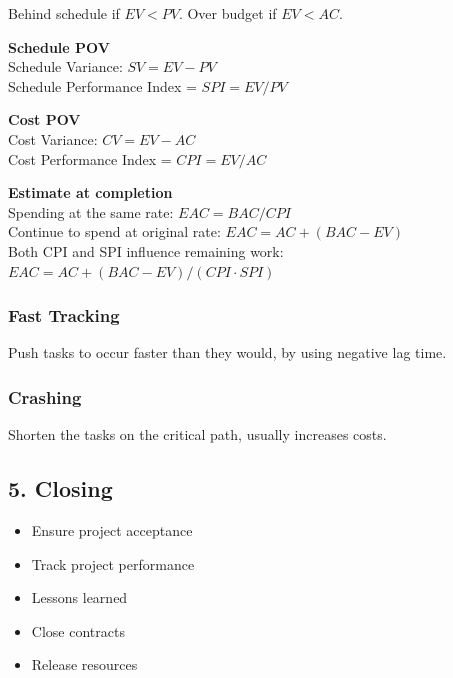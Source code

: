 Behind schedule if $EV < PV$.
Over budget if $EV < AC$.

\textbf{Schedule POV}\\
Schedule Variance: $SV = EV - PV$\\
Schedule Performance Index = $SPI = EV/PV$

\textbf{Cost POV}\\
Cost Variance: $CV = EV - AC$\\
Cost Performance Index = $CPI = EV/AC$

\textbf{Estimate at completion}\\
Spending at the same rate: $EAC = BAC/CPI$\\
Continue to spend at original rate: $EAC = AC + (BAC - EV)$\\
Both CPI and SPI influence remaining work: $EAC = AC + (BAC - EV) / (CPI \cdot SPI)$

\subsubsection{Fast Tracking}
Push tasks to occur faster than they would, by using negative lag time.

\subsubsection{Crashing}
Shorten the tasks on the critical path, usually increases costs.

\subsection{5. Closing}
\begin{itemize}
    \item Ensure project acceptance
    \item Track project performance
    \item Lessons learned
    \item Close contracts
    \item Release resources
\end{itemize}
